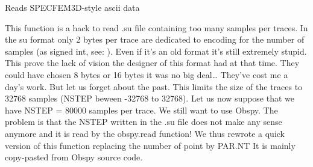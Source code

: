 \documentclass[letterpaper,10pt,english]{sphinxmanual}
\begin{document}
\begin{fulllineitems}
\label{\detokenize{ref/seisflows.plugins:seisflows.plugins.readers.ascii}}
Reads SPECFEM3D-style ascii data

\end{fulllineitems}


\begin{fulllineitems}
\label{\detokenize{ref/seisflows.plugins:seisflows.plugins.readers.readBigSuFile}}
This function is a hack to read .su file containing too many samples
per traces.
In the su format only 2 bytes per trace are dedicated to encoding for
the number of samples (as signed int, see:
).
Even if it’s an old format it’s still extremely stupid.
This prove the lack of vision the designer of this format had at that
time. They could have chosen 8 bytes or 16 bytes it was no big deal…
They’ve cost me a day’s work.
But let us forget about the past. This limits the size of the
traces to 32768 samples (NSTEP beween -32768 to 32768). Let us now
suppose that we have NSTEP = 80000 samples per trace. We still want to
use Obspy. The problem is that the NSTEP written in the .su file does
not make any sense anymore and it is read by the obspy.read function!
We thus rewrote a quick version of this function replacing the number
of point by PAR.NT
It is mainly copy-pasted from Obspy source code.

\end{fulllineitems}

\end{document}
